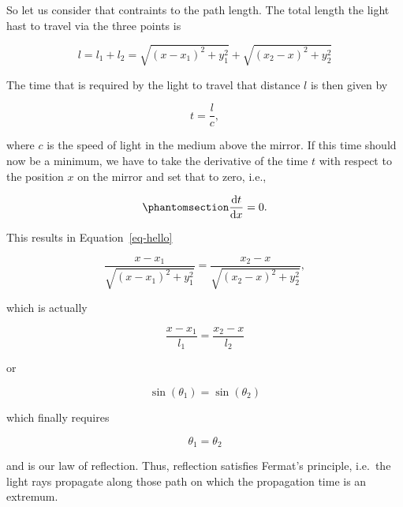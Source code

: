 \documentclass[
  a4paper,
]{book}
\begin{document}
So let us consider that contraints to the path length. The total length
the light hast to travel via the three points is

\[
l=l_{1}+l_{2}=\sqrt{(x-x_1)^2+y_1^2}+\sqrt{(x_2-x)^2+y_2^2}
\]

The time that is required by the light to travel that distance \(l\) is
then given by

\[
t=\frac{l}{c},
\]

where \(c\) is the speed of light in the medium above the mirror. If
this time should now be a minimum, we have to take the derivative of the
time \(t\) with respect to the position \(x\) on the mirror and set that
to zero, i.e.,

\begin{equation}\phantomsection\label{eq-hello}{\frac{\mathrm dt}{\mathrm dx}=0.}\end{equation}

This results in Equation~\ref{eq-hello}

\[
\frac{x-x_1}{\sqrt{(x-x_1)^2+y_{1}^2}}=\frac{x_2-x}{\sqrt{(x_2-x)^2+y_{2}^2}},
\]

which is actually

\[
\frac{x-x_1}{l_1}=\frac{x_2-x}{l_2}
\]

or

\[
\sin(\theta_1)=\sin(\theta_2)
\]

which finally requires

\[
\theta_1=\theta_2
\]

and is our law of reflection. Thus, reflection satisfies Fermat's
principle, i.e.~the light rays propagate along those path on which the
propagation time is an extremum.
\end{document}
